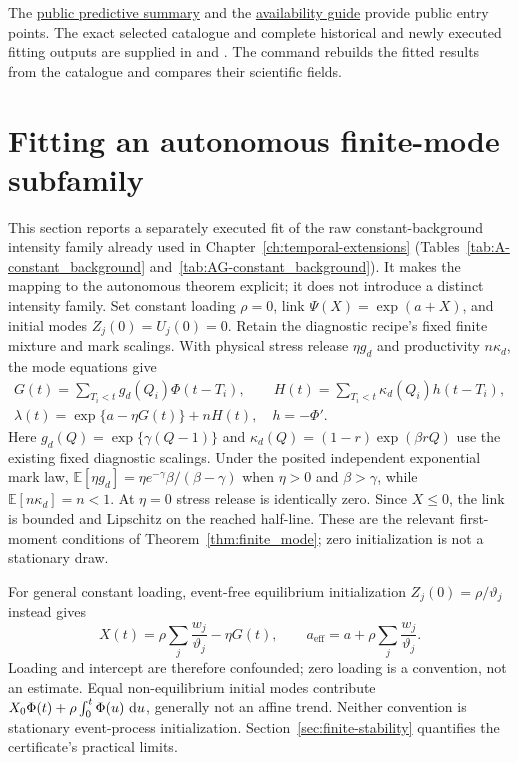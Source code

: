 The \href{https://github.com/Drefetr/An_Evaluation_of_Earthquake_Models/blob/61aa599cd023f2441a6a0c6af9aa4b6fe9eda3e5/paper/data/prediction.json}{public predictive summary} and the \hyperref[sec:source-supplements]{availability guide} provide public entry points. The exact selected catalogue and complete historical and newly executed fitting outputs are supplied in  and . The command  rebuilds the fitted results from the catalogue and compares their scientific fields.


\section{Fitting an autonomous finite-mode subfamily}
\label{sec:autonomous-nz-comparison}

This section reports a separately executed fit of the raw constant-background
intensity family already used in Chapter~\ref{ch:temporal-extensions}
(Tables~\ref{tab:A-constant_background} and~\ref{tab:AG-constant_background}).
It makes the mapping to the autonomous theorem explicit; it does not introduce
a distinct intensity family.
Set constant loading $\rho=0$, link $\Psi(X)=\exp(a+X)$, and initial modes
$Z_j(0)=U_j(0)=0$. Retain the diagnostic recipe's fixed finite mixture and mark
scalings. With physical stress release $\eta g_d$ and productivity $n\kappa_d$,
the mode equations give
\[
 \begin{gathered}
 G(t)=\sum_{T_i<t}g_d(Q_i)\Phi(t-T_i),\qquad
 H(t)=\sum_{T_i<t}\kappa_d(Q_i)h(t-T_i),\\
 \lambda(t)=\exp\{a-\eta G(t)\}+nH(t),\quad h=-\Phi'.
 \end{gathered}
\]
Here $g_d(Q)=\exp\{\gamma(Q-1)\}$ and
$\kappa_d(Q)=(1-r)\exp(\beta rQ)$ use the existing fixed diagnostic scalings.
Under the posited independent exponential mark law,
$\mathbb E[\eta g_d]=\eta e^{-\gamma}\beta/(\beta-\gamma)$ when
$\eta>0$ and $\beta>\gamma$, while $\mathbb E[n\kappa_d]=n<1$.
At $\eta=0$ stress release is identically zero. Since $X\leq0$, the link is
bounded and Lipschitz on the reached half-line. These are the relevant
first-moment conditions of Theorem~\ref{thm:finite_mode}; zero initialization
is not a stationary draw.

For general constant loading, event-free equilibrium initialization
$Z_j(0)=\rho/\vartheta_j$ instead gives
\[
 X(t)=\rho\sum_j\frac{w_j}{\vartheta_j}-\eta G(t),\qquad
 a_{\mathrm{eff}}=a+\rho\sum_j\frac{w_j}{\vartheta_j}.
\]
Loading and intercept are therefore confounded; zero loading is a convention,
not an estimate. Equal non-equilibrium initial modes contribute
$X_0\Phi(t)+\rho\int_0^t\Phi(u)\,\mathop{}\!\mathrm{d} u$, generally not an affine trend.
Neither convention is stationary event-process initialization.
Section~\ref{sec:finite-stability} quantifies the certificate's practical limits.


